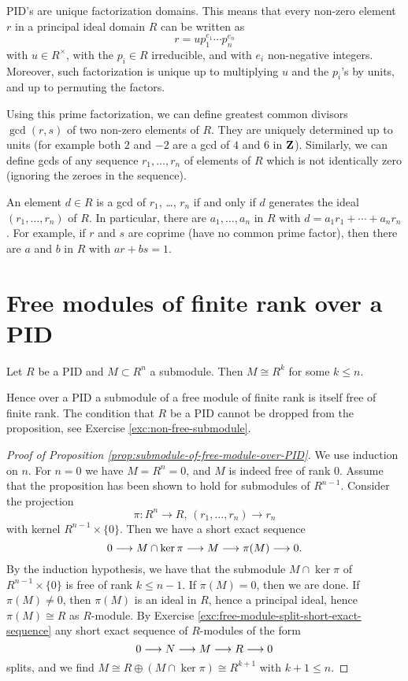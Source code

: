 PID's are unique factorization domains. This means that every non-zero element $r$ in a principal ideal domain $R$ can be written as
\[
	r = u p_1^{e_1} \cdots p_n^{e_n}
\]
with $u \in R^\times$, with the $p_i \in R$ irreducible, and with $e_i$ non-negative integers. Moreover, such factorization is unique up to multiplying $u$ and the $p_i$'s by units, and up to permuting the factors.

Using this prime factorization, we can define greatest common divisors  $\gcd(r,s)$ of two non-zero elements of $R$. They are uniquely determined up to units (for example both $2$ and $-2$ are a gcd of $4$ and $6$ in ${\mathbf{Z}}$). Similarly, we can define gcds of any sequence $r_1,\ldots,r_n$ of elements of $R$ which is not identically zero (ignoring the zeroes in the sequence).

An element $d\in R$ is a gcd of $r_1$, \ldots, $r_n$ if and only if $d$ generates the ideal $(r_1,\ldots, r_n)$ of $R$. In particular, there are $a_1,\ldots, a_n$ in $R$ with $d=a_1r_1+\cdots+a_nr_n$. For example, if $r$ and $s$ are coprime (have no common prime factor), then there are $a$ and $b$ in $R$ with $ar+bs=1$.


\section{Free modules of finite rank over a PID}



\begin{proposition}\label{prop:submodule-of-free-module-over-PID}
Let $R$ be a PID and $M\subset R^n$ a submodule. Then $M\cong R^k$ for some $k\leq n$.
\end{proposition}

Hence over a PID a submodule of a free module of finite rank is itself free of finite rank.   
The condition that $R$ be a PID cannot be dropped from the proposition, see Exercise \ref{exc:non-free-submodule}. 


\begin{proof}[Proof of Proposition \ref{prop:submodule-of-free-module-over-PID}]
We use induction on $n$. For $n=0$ we have $M=R^n=0$, and $M$ is indeed free of rank $0$. Assume that the proposition has been shown to hold for submodules of $R^{n-1}$. Consider the projection
\[
	\pi\colon R^n \to R,\, (r_1,\ldots, r_n) \to r_n
\]
with kernel $R^{n-1}\times \{0\}$. Then we have a short exact sequence
\[
	0 \longrightarrow M \cap \ker \pi \longrightarrow M \longrightarrow \pi(M) \longrightarrow 0.
\] 
By the induction hypothesis, we have that the submodule $M\cap \ker \pi$ of $R^{n-1}\times \{0\}$ is free of rank $k\leq n-1$. If $\pi(M)=0$, then we are done. If $\pi(M)\neq 0$, then $\pi(M)$ is an ideal in $R$,
hence a principal ideal, hence $\pi(M)\cong R$ as $R$-module. By Exercise \ref{exc:free-module-split-short-exact-sequence}
any short exact sequence of $R$-modules of the form
\[
	0 \longrightarrow N \longrightarrow M \longrightarrow R \longrightarrow 0
\]
splits, and we find $M \cong R \oplus (M \cap \ker \pi) \cong R^{k+1}$ with $k+1\leq n$.
\end{proof}


